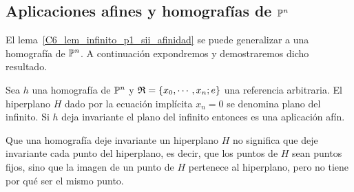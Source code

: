 \subsection{Aplicaciones afines y homografías de $\mathbb{P}^n$}
El lema~\ref{C6_lem_infinito_p1_sii_afinidad} se puede generalizar a una homografía de $\mathbb{P}^n$. A continuación expondremos y demostraremos dicho resultado.

\begin{prop}
	Sea $h$ una homografía de $\mathbb{P}^n$ y $\mathfrak{R}=\{x_0,\cdots,x_n;e\}$ una referencia arbitraria. El hiperplano $H$ dado por la ecuación implícita $x_n=0$ se denomina plano del infinito. Si $h$ deja invariante el plano del infinito entonces es una aplicación afín.
\end{prop}
\begin{obs}
	Que una homografía deje invariante un hiperplano $H$ no significa que deje invariante cada punto del hiperplano, es decir, que los puntos de $H$ sean puntos fijos, sino que la imagen de un punto de $H$ pertenece al hiperplano, pero no tiene por qué ser el mismo punto.
\end{obs}

